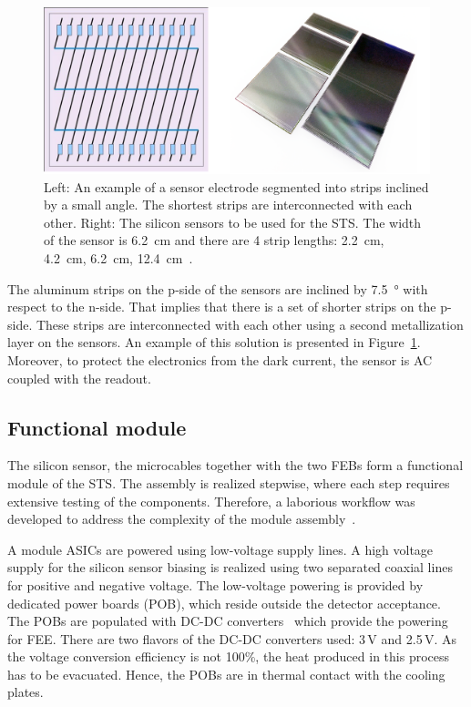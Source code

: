 \begin{figure}[!h]
\centering
\includegraphics[width=0.75\columnwidth]{Chapter2/images/silicon_sensors.png}
\caption{Left: An example of a sensor electrode segmented into strips inclined by a small angle. The shortest strips are interconnected with each other. Right: The silicon sensors to be used for the \gls{STS}. The width of the sensor is \SI{6.2}{\centi\metre} and there are 4 strip lengths: \SI{2.2}{\centi\metre}, \SI{4.2}{\centi\metre}, \SI{6.2}{\centi\metre}, \SI{12.4}{\centi\metre}~\cite{Heuser:54798}.}
\label{fig_sts_si}
\end{figure}

The aluminum strips on the p-side of the sensors are inclined by \SI{7.5}{\degree} with respect to the n-side. That implies that there is a set of shorter strips on the p-side. These strips are interconnected with each other using a second metallization layer on the sensors. An example of this solution is presented in Figure~\ref{fig_sts_si}. Moreover, to protect the electronics from the dark current, the sensor is AC coupled with the readout.
\subsection{Functional module}
\label{sts_module}
The silicon sensor, the microcables together with the two \glspl{FEB} form a functional module of the \gls{STS}. The assembly is realized stepwise, where each step requires extensive testing of the components. Therefore, a laborious workflow was developed to address the complexity of the module assembly~\cite{carmen2}. 

A module \glspl{ASIC} are powered using low-voltage supply lines. A high voltage supply for the silicon sensor biasing is realized using two separated coaxial lines for positive and negative voltage. The low-voltage powering is provided by dedicated power boards (\gls{POB}), which reside outside the detector acceptance. The \glspl{POB} are populated with DC-DC converters~\cite{DC_DC_converter} which provide the powering for \gls{FEE}. There are two flavors of the DC-DC converters used: 3\,V and 2.5\,V. As the voltage conversion efficiency is not 100\%, the heat produced in this process has to be evacuated. Hence, the \glspl{POB} are in thermal contact with the cooling plates. 

